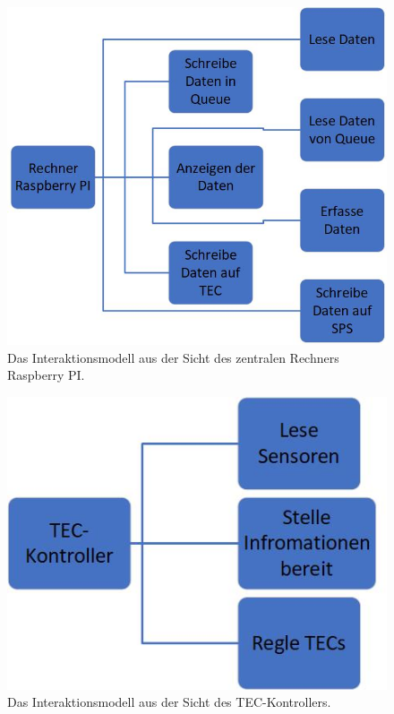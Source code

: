 \begin{figure}[H]
    \centering
    \includegraphics[scale=0.5]{98_images/interaktionsmodell_rp.jpg}
    \caption{Das Interaktionsmodell aus der Sicht des zentralen Rechners Raspberry PI.}
    \label{fig:interaktionsmodell_rp}
\end{figure}

\begin{figure}[H]
    \centering
    \includegraphics[scale=0.5]{98_images/interaktionsmodell_tec.jpg}
    \caption{Das Interaktionsmodell aus der Sicht des TEC-Kontrollers.}
    \label{fig:interaktionsmodell_tec}
\end{figure}

